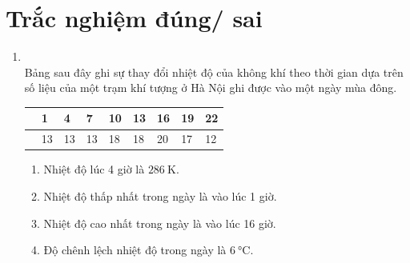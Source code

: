 \section{Trắc nghiệm đúng/ sai}
\begin{enumerate}[label=\bfseries Câu \arabic*:, leftmargin=1.7cm]
	\item {}\\
	Bảng sau đây ghi sự thay đổi nhiệt độ của không khí theo thời gian dựa trên số liệu của một trạm khí tượng ở Hà Nội ghi được vào một ngày mùa đông.
	\begin{center}
		\begin{tabular}{|C{8em}|C{1.5em}|C{1.5em}|C{1.5em}|C{1.5em}|C{1.5em}|C{1.5em}|C{1.5em}|C{1.5em}|}
			\hline
			& 1 & 4 & 7 & 10 & 13 & 16 & 19 & 22\\
			\hline
			 & 13 & 13 &13 & 18& 18 & 20 & 17 & 12\\
			\hline
		\end{tabular}
	\end{center}
\begin{enumerate}[label=\alph*)]
	\item Nhiệt độ lúc 4 giờ là $\SI{286}{\kelvin}$.
	\item Nhiệt độ thấp nhất trong ngày là vào lúc 1 giờ.
	\item Nhiệt độ cao nhất trong ngày là vào lúc 16 giờ.
	\item Độ chênh lệch nhiệt độ trong ngày là $\SI{6}{\celsius}$.
\end{enumerate}


\end{enumerate}
